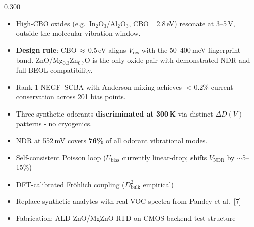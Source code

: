 \documentclass[final]{beamer}
\begin{document}
\begin{frame}[t]{}
\begin{columns}[T]
\begin{column}{0.300\textwidth}
\begin{tcolorbox}[posterbox, title={Conclusions}]
\small
\begin{itemize}\setlength\itemsep{9pt}
  \item[\textcolor{navyblue}{$\blacktriangleright$}]
    High-CBO oxides (e.g.\ In$_2$O$_3$/Al$_2$O$_3$,
    CBO\,=\,2.8\,eV) resonate at 3–5\,V, outside the
    molecular vibration window.
  \item[\textcolor{navyblue}{$\blacktriangleright$}]
    \textbf{Design rule}: CBO\,$\approx$\,0.5\,eV aligns
    $V_\mathrm{res}$ with the 50–400\,meV fingerprint band.
    ZnO/Mg$_{0.3}$Zn$_{0.7}$O is the only oxide pair with
    demonstrated NDR and full BEOL compatibility.
  \item[\textcolor{navyblue}{$\blacktriangleright$}]
    Rank-1 NEGF–SCBA with Anderson mixing achieves
    $<0.2\%$ current conservation across 201 bias points.
  \item[\textcolor{navyblue}{$\blacktriangleright$}]
    Three synthetic odorants \textbf{discriminated at 300\,K}
    via distinct $\Delta D(V)$ patterns - no cryogenics.
  \item[\textcolor{navyblue}{$\blacktriangleright$}]
    NDR at 552\,mV covers \textbf{76\%} of all odorant
    vibrational modes.
\end{itemize}
\end{tcolorbox}

\vfill

\begin{tcolorbox}[methodbox, title={Open Items \& Future Work}]
\small
\begin{itemize}\setlength\itemsep{7pt}
  \item Self-consistent Poisson loop
        ($U_\mathrm{bias}$ currently linear-drop; shifts
        $V_\mathrm{NDR}$ by $\sim$5–15\%)
  \item DFT-calibrated Fröhlich coupling
        ($D_\mathrm{bulk}^2$ empirical)
  \item Replace synthetic analytes with real VOC spectra
        from Pandey et al.\ [7]
  \item Fabrication: ALD ZnO/MgZnO RTD on CMOS
        backend test structure
\end{itemize}
\end{tcolorbox}

\vfill


\end{column}
\end{columns}
\end{frame}
\end{document}

